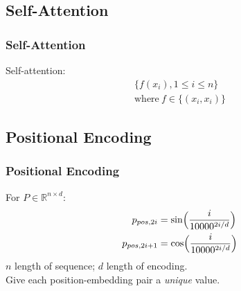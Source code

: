 \documentclass[]{beamer}
\newcommand{\bb}[1]{\mathbb{#1}}
\newcommand{\x}{\times}
\begin{document}
\subsection{Self-Attention}
\begin{frame}
    \frametitle{Self-Attention}
    Self-attention: 
    \begin{align*}
        \{f(x_i), 1 \le i \le n\}  \\
        \text{where}~f \in \{(x_i, x_i)\}
    \end{align*}

\end{frame}

\subsection{Positional Encoding}
\begin{frame}
    \frametitle{Positional Encoding}
    For $P \in \bb{R}^{n\x d}$:
    \begin{align*}
        p_{pos,2i} &= \sin \Bigl(\frac{i}{10000^{2i/d}}\Bigr) \\
        p_{pos,2i+1} &= \cos \Bigl(\frac{i}{10000^{2i/d}}\Bigr)
    \end{align*}
    $n$\: length of sequence; $d$\: length of encoding. \\
    Give each position-embedding pair a \emph{unique} value.
\end{frame}
\end{document}
